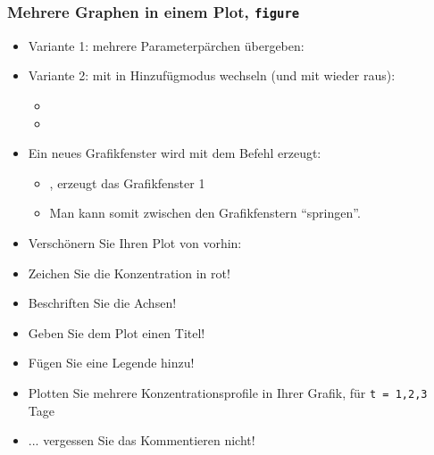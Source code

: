       \begin{frame}
          \frametitle{Mehrere Graphen in einem Plot, \texttt{figure}}
          \begin{itemize}
              \item Variante 1: mehrere Parameterpärchen übergeben: 
              \item Variante 2: mit  in Hinzufügmodus wechseln (und mit  wieder raus):
              \begin{itemize}
                  \item {}
                  \item {}
              \end{itemize}
              \item Ein neues Grafikfenster wird mit dem Befehl  erzeugt:
              \begin{itemize}
                  \item {}, erzeugt das Grafikfenster 1
                  \item Man kann somit zwischen den Grafikfenstern ``springen''.
              \end{itemize}
          \end{itemize}
      \end{frame}


      \secMexercise
      \begin{frame}
          \frameMexercise
          \begin{exercise}
              \sloppy
              \begin{itemize}
                  \item Verschönern Sie Ihren Plot von vorhin:
                  \item Zeichen Sie die Konzentration in rot!
                  \item Beschriften Sie die Achsen!
                  \item Geben Sie dem Plot einen Titel!
                  \item Fügen Sie eine Legende hinzu!
                  \item Plotten Sie mehrere Konzentrationsprofile in Ihrer Grafik, für \texttt{t = 1,2,3} Tage
                  \item ... vergessen Sie das \alert{Kommentieren} nicht!
              \end{itemize}
          \end{exercise}
      \end{frame}

